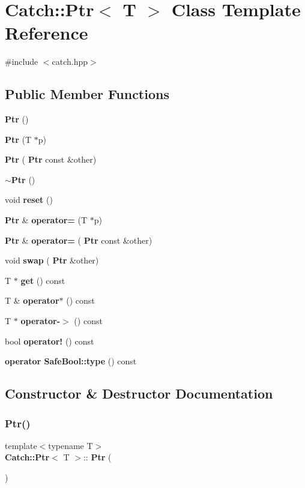 \section{Catch\+:\+:Ptr$<$ T $>$ Class Template Reference}
\label{class_catch_1_1_ptr}


{\ttfamily \#include $<$catch.\+hpp$>$}

\subsection*{Public Member Functions}
\begin{DoxyCompactItemize}
\item 
\textbf{ Ptr} ()
\item 
\textbf{ Ptr} (T $\ast$p)
\item 
\textbf{ Ptr} (\textbf{ Ptr} const \&other)
\item 
\textbf{ $\sim$\+Ptr} ()
\item 
void \textbf{ reset} ()
\item 
\textbf{ Ptr} \& \textbf{ operator=} (T $\ast$p)
\item 
\textbf{ Ptr} \& \textbf{ operator=} (\textbf{ Ptr} const \&other)
\item 
void \textbf{ swap} (\textbf{ Ptr} \&other)
\item 
T $\ast$ \textbf{ get} () const
\item 
T \& \textbf{ operator$\ast$} () const
\item 
T $\ast$ \textbf{ operator-\/$>$} () const
\item 
bool \textbf{ operator!} () const
\item 
\textbf{ operator Safe\+Bool\+::type} () const
\end{DoxyCompactItemize}


\subsection{Constructor \& Destructor Documentation}
\mbox{\label{class_catch_1_1_ptr_a6108f0195595ee9d7a411daea810beaf}} 
\subsubsection{Ptr()\hspace{0.1cm}{\footnotesize\ttfamily [1/3]}}
{\footnotesize\ttfamily template$<$typename T$>$ \\
\textbf{ Catch\+::\+Ptr}$<$ T $>$\+::\textbf{ Ptr} (\begin{DoxyParamCaption}{ }\end{DoxyParamCaption})\hspace{0.3cm}{\ttfamily [inline]}}

